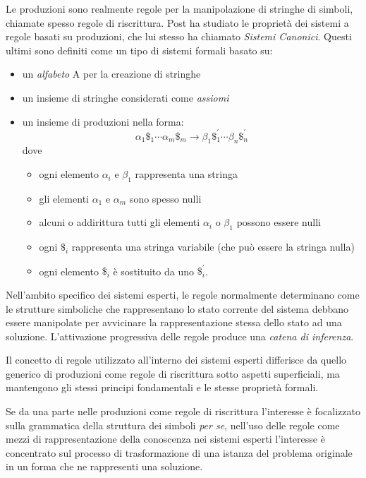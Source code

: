Le produzioni sono realmente regole per la manipolazione di stringhe di simboli, chiamate spesso regole di riscrittura. Post ha studiato le proprietà dei sistemi a regole basati su produzioni, che lui stesso ha chiamato \emph{Sistemi Canonici}. Questi ultimi sono definiti come un tipo di sistemi formali basato su:

\begin{itemize}
	\item un \emph{alfabeto} A per la creazione di stringhe
	\item un insieme di stringhe considerati come \emph{assiomi}
	\item un insieme di produzioni nella forma: 
	\[
	\alpha_1\$_1 \cdots \alpha_m\$_m \rightarrow \beta_1\$_1^{'} \cdots \beta_n\$_n^{'}
	\]	
	dove
	\begin{itemize}
		\item ogni elemento $\alpha_i$ e $\beta_1$ rappresenta una stringa
		\item gli elementi $\alpha_1$ e $\alpha_m$ sono spesso nulli
		\item alcuni o addirittura tutti gli elementi $\alpha_i$ o $\beta_1$ possono essere nulli
		\item ogni $\$_i$ rappresenta una stringa variabile (che può essere la stringa nulla)
		\item ogni elemento $\$_i$ è sostituito da uno $\$_i^{'}$.
	\end{itemize}
\end{itemize}

Nell'ambito specifico dei sistemi esperti, le regole normalmente determinano come le strutture simboliche che rappresentano lo stato corrente del sistema debbano essere manipolate per avvicinare la rappresentazione stessa dello stato ad una soluzione. L'attivazione progressiva delle regole produce una \emph{catena di inferenza}.

Il concetto di regole utilizzato  all'interno dei sistemi esperti differisce da quello generico di produzioni come regole di riscrittura sotto aspetti superficiali, ma mantengono gli stessi principi fondamentali e le stesse proprietà formali.

Se da una parte nelle produzioni come regole di riscrittura l'interesse è focalizzato sulla grammatica della struttura dei simboli \emph{per se}, nell'uso delle regole come mezzi di rappresentazione della conoscenza nei sistemi esperti l'interesse è concentrato sul processo di trasformazione di una istanza del problema originale in un forma che ne rappresenti una soluzione.


